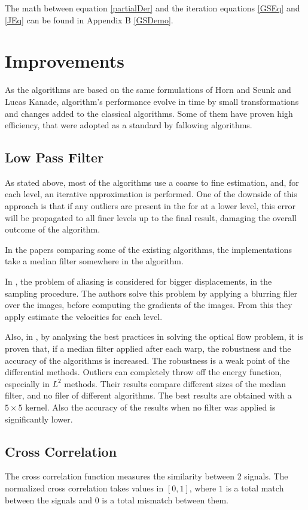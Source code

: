 \documentclass[12pt,a4paper,twoside]{report}
\begin{document}
{The math between equation \ref{partialDer} and the iteration equations \ref{GSEq} and \ref{JEq} can be found in Appendix B \ref{GSDemo}.
\section{Improvements}

As the algorithms are based on the same formulations of Horn and Scunk and Lucas Kanade, algorithm's performance evolve in time by small transformations and changes added to the classical algorithms. Some of them have proven high efficiency, that were adopted as a standard by fallowing algorithms.

\subsection{Low Pass Filter}

As stated above, most of the algorithms use a coarse to fine estimation, and, for each level, an iterative approximation is performed.
One of the downside of this approach is that if any outliers are present in the for at a lower level, this error will be propagated to all finer levels up to the final result, damaging the overall outcome of the algorithm.

In the papers comparing some of the existing algorithms, the implementations take a median filter somewhere in the algorithm.

In \cite{fleet2006}, the problem of aliasing is considered for bigger displacements, in the sampling procedure. The authors solve this problem by applying a blurring filer over the images, before computing the gradients of the images. From this they apply estimate the velocities for each level.

Also, in \cite{sun2010}, by analysing the best practices in solving the optical flow problem, it is proven that, if a median filter applied after each warp, the robustness and the accuracy of the algorithms is increased.
The robustness is a weak point of the differential methods. Outliers can completely throw off the energy function, especially in $L^2$ methods.
Their results compare different sizes of the median filter, and no filer of different algorithms. The best results are obtained with a $5 \times 5$ kernel. Also the accuracy of the results when no filter was applied is significantly lower.  


\subsection{Cross Correlation}
The cross correlation function measures the similarity between 2 signals.
The normalized cross correlation takes values in $[0,1]$, where $1$ is a total match between the signals and $0$ is a total mismatch between them.

}
\end{document}
